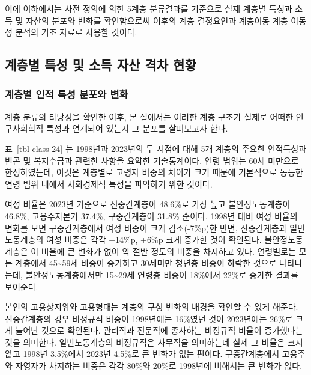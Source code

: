 \documentclass[
  letterpaper,
  DIV=11,
  numbers=noendperiod]{scrartcl}
\begin{document}
이에 이하에서는 사전 정의에 의한 5계층 분류결과를 기준으로 실제 계층별
특성과 소득 및 자산의 분포와 변화를 확인함으로써 이후의 계층 결정요인과
계층이동 계층 이동성 분석의 기초 자료로 사용할 것이다.

\newpage{}

\subsection{계층별 특성 및 소득 자산 격차
현황}\label{uxacc4uxce35uxbcc4-uxd2b9uxc131-uxbc0f-uxc18cuxb4dd-uxc790uxc0b0-uxaca9uxcc28-uxd604uxd669}

\subsubsection{계층별 인적 특성 분포와
변화}\label{uxacc4uxce35uxbcc4-uxc778uxc801-uxd2b9uxc131-uxbd84uxd3ecuxc640-uxbcc0uxd654}

계층 분류의 타당성을 확인한 이후, 본 절에서는 이러한 계층 구조가 실제로
어떠한 인구사회학적 특성과 연계되어 있는지 그 분포를 살펴보고자 한다.

표~\ref{tbl-class-24} 는 1998년과 2023년의 두 시점에 대해 5개 계층의
주요한 인적특성과 빈곤 및 복지수급과 관련한 사항을 요약한 기술통계이다.
연령 범위는 60세 미만으로 한정하였는데, 이것은 계층별로 고령자 비중의
차이가 크기 때문에 기본적으로 동등한 연령 범위 내에서 사회경제적 특성을
파악하기 위한 것이다.

여성 비율은 2023년 기준으로 신중간계층이 48.6\%로 가장 높고
불안정노동계층이 46.8\%, 고용주자본가 37.4\%, 구중간계층이 31.8\%
순이다. 1998년 대비 여성 비율의 변화를 보면 구중간계층에서 여성 비중이
크게 감소(-7\%p)한 반면, 신중간계층과 일반노동계층의 여성 비중은 각각
+14\%p, +6\%p 크게 증가한 것이 확인된다. 불안정노동계층은 이 비율에 큰
변화가 없이 약 절반 정도의 비중을 차지하고 있다. 연령별로는 모든
계층에서 45\textasciitilde59세 비중이 증가하고 30세미만 청년층 비중이
하락한 것으로 나타나는데, 불안정노동계층에서만 15\textasciitilde29세
연령층 비중이 18\%에서 22\%로 증가한 결과를 보여준다.

본인의 고용상지위와 고용형태는 계층의 구성 변화의 배경을 확인할 수 있게
해준다. 신중간계층의 경우 비정규직 비중이 1998년에는 16\%였던 것이
2023년에는 26\%로 크게 늘어난 것으로 확인된다. 관리직과 전문직에
종사하는 비정규직 비율이 증가했다는 것을 의미한다. 일반노동계층의
비정규직은 사무직을 의미하는데 실제 그 비율은 크지 않고 1998년 3.5\%에서
2023년 4.5\%로 큰 변화가 없는 편이다. 구중간계층에서 고용주와 자영자가
차지하는 비중은 각각 80\%와 20\%로 1998년에 비해서는 큰 변화가 없다.
\end{document}
